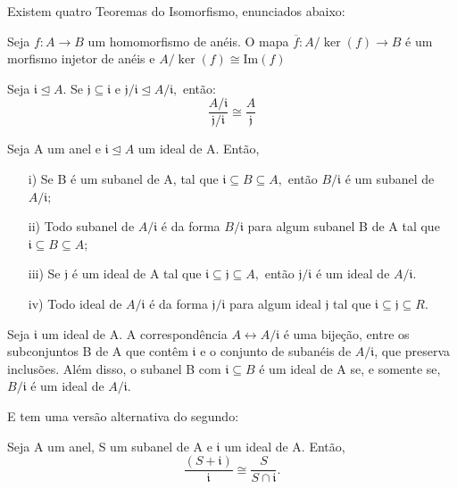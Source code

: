 \documentclass[../algebraIII_notes.tex]{subfiles}
\begin{document}
\begin{tcolorbox}[
		skin=enhanced,
		title=Lembrete!,
		after title={\hfill Teoremas do Isomorfismo},
		fonttitle=\bfseries,
		sharp corners=downhill,
		colframe=black,
		colbacktitle=yellow!75!white,
		colback=yellow!30,
		colbacklower=black,
		coltitle=black,
		drop large lifted shadow
	]
	Existem quatro \hypertarget{isomorphism_theorem}{Teoremas do Isomorfismo}, enunciados abaixo:
	\hypertarget{first_isomorphism}{
		\begin{theorem*}
			Seja \(f:A\rightarrow B\) um homomorfismo de anéis. O mapa \(\overline{f}:A/\ker{(f)}\rightarrow B\)
			é um morfismo injetor de anéis e \(A/\ker{(f)}\cong{\mathrm{Im}(f)}\)
		\end{theorem*}}
	\hypertarget{second_isomorphism}{
		\begin{theorem*}
			Seja \(\mathfrak{i}\trianglelefteq{A}.\) Se \(\mathfrak{j}\subseteq \mathfrak{i}\) e \(\mathfrak{j}/\mathfrak{i}\trianglelefteq{A/\mathfrak{i}},\) então:
			\[
				\frac{A/\mathfrak{i}}{\mathfrak{j}/\mathfrak{i}}\cong{\frac{A}{\mathfrak{j}}}
			\]
		\end{theorem*}}
	\begin{theorem*}
		Seja A um anel e \(\mathfrak{i} \trianglelefteq{A}\) um ideal de A. Então,
		\begin{itemize}
			\item[i)] Se B é um subanel de A, tal que \(\mathfrak{i}\subseteq B\subseteq A,\) então \(B/\mathfrak{i}\) é um
			      subanel de \(A/\mathfrak{i};\)
			\item[ii)] Todo subanel de \(A/\mathfrak{i}\) é da forma \(B/\mathfrak{i}\) para algum subanel B de A tal que
			      \(\mathfrak{i} \subseteq B \subseteq A\);
			\item[iii)] Se \(\mathfrak{j}\) é um ideal de A tal que \(\mathfrak{i}\subseteq \mathfrak{j}\subseteq A,\) então
			      \(\mathfrak{j}/\mathfrak{i}\) é um ideal de \(A/\mathfrak{i}.\)
			\item[iv)] Todo ideal de \(A/\mathfrak{i}\) é da forma \(\mathfrak{j}/\mathfrak{i}\) para algum ideal \(\mathfrak{j}\) tal que
			      \(\mathfrak{i}\subseteq \mathfrak{j}\subseteq R.\)
		\end{itemize}
	\end{theorem*}
	\begin{theorem*}
		Seja \(\mathfrak{i}\) um ideal de A. A correspondência \(A\longleftrightarrow A/\mathfrak{i}\) é uma bijeção, entre os subconjuntos B de A que contêm \(\mathfrak{i}\) e o
		conjunto de subanéis de \(A/\mathfrak{i}\), que preserva inclusões. Além disso, o subanel B com \(\mathfrak{i} \subseteq B\) é um ideal de A se, e somente se,
		\(B/\mathfrak{i}\) é um ideal de \(A/\mathfrak{i}\).
	\end{theorem*}

	E tem uma versão alternativa do segundo:
	\begin{theorem*}
		Seja A um anel, S um subanel de A e \(\mathfrak{i}\) um ideal de A. Então,
		\[
			\frac{(S+\mathfrak{i})}{\mathfrak{i}}\cong{\frac{S}{S\cap \mathfrak{i}}}.
		\]
	\end{theorem*}
\end{tcolorbox}
\end{document}
